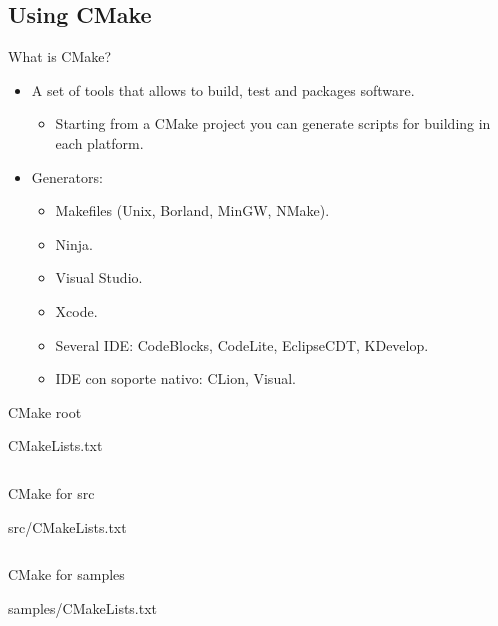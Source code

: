 \subsection{Using CMake}

\begin{frame}[t]{What is CMake?}
\begin{itemize}
  \item A set of tools that allows to build, test and packages software.
  
    \begin{itemize}
      \item Starting from a CMake project you can generate scripts for
            building in each platform.
    \end{itemize}

  \item Generators:
    \begin{itemize}
      \item Makefiles (Unix, Borland, MinGW, NMake).
      \item Ninja.
      \item Visual Studio.
      \item Xcode.
      \item Several IDE:  CodeBlocks, CodeLite, EclipseCDT, KDevelop.
      \item IDE con soporte nativo: CLion, Visual.
    \end{itemize}
\end{itemize}
\end{frame}

\begin{frame}[t]{CMake root}
\begin{block}{CMakeLists.txt}\tiny
\inputminted{cmake}{examples/vector1/CMakeLists.txt}
\end{block}
\end{frame}

\begin{frame}[t]{CMake for src}
\begin{block}{src/CMakeLists.txt}\tiny
\inputminted{cmake}{examples/vector1/src/CMakeLists.txt}
\end{block}
\end{frame}

\begin{frame}[t]{CMake for samples}
\begin{block}{samples/CMakeLists.txt}\tiny
\inputminted{cmake}{examples/vector1/samples/CMakeLists.txt}
\end{block}
\end{frame}

